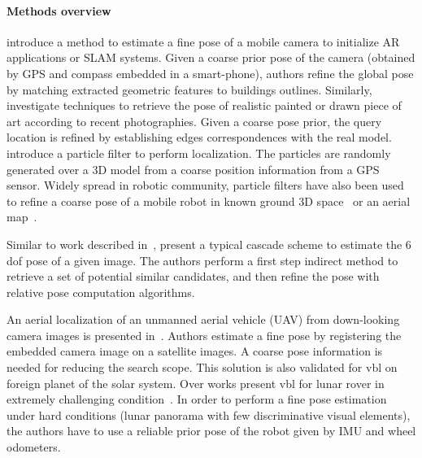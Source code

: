 		\paragraph{Methods overview}
			\citet{Arth2015} introduce a method to estimate a fine pose of a mobile camera to initialize AR applications or SLAM systems. Given a coarse prior pose of the camera (obtained by GPS and compass embedded in a smart-phone), authors refine the global pose by matching extracted geometric features to buildings outlines. Similarly, \citet{Russell2011} investigate techniques to retrieve the pose of realistic painted or drawn piece of art according to recent photographies. Given a coarse pose prior, the query location is refined by establishing edges correspondences with the real model. \citet{Poglitsch2015} introduce a particle filter to perform localization. The particles are randomly generated over a 3D model from a coarse position information from a GPS sensor. Widely spread in robotic community, particle filters have also been used to refine a coarse pose of a mobile robot in known ground 3D space~\citep{Mason2011} or an aerial map~\citep{Christie2016,Brubaker2016}.
			
            Similar to work described in~\citep{Rubio2015,Sattler2017}, \citet{Song2016} present a typical cascade scheme to estimate the 6 \ac{dof} pose of a given image. The authors perform a first step indirect method to retrieve a set of potential similar candidates, and then refine the pose with relative pose computation algorithms. 
		
			An aerial localization of an unmanned aerial vehicle (UAV) from down-looking camera images is presented in~\citep{Wan2016}. Authors estimate a fine pose by registering the embedded camera image on a satellite images. A coarse pose information is needed for reducing the search scope. This solution is also validated for \ac{vbl} on foreign planet of the solar system. Over works present \ac{vbl} for lunar rover in extremely challenging condition~\citep{Wan2014}. In order to perform a fine pose estimation under hard conditions (lunar panorama with few discriminative visual elements), the authors have to use a reliable prior pose of the robot given by IMU and wheel odometers.
					
